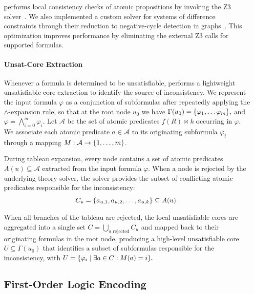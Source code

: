 \documentclass{easychair}
\begin{document}
\stlsat{} performs local consistency checks of atomic propositions by invoking the Z3 solver~\cite{Z3}.
We also implemented a custom solver for systems of difference constraints through their reduction to negative-cycle detection in graphs~\cite{cormen2022introduction,armando2004sat,DutertreM06}.
This optimization improves performance by eliminating the external Z3 calls for supported formulas.


\paragraph{\textbf{Unsat-Core Extraction}}

Whenever a formula is determined to be unsatisfiable, \stlsat{} performs a lightweight unsatisfiable-core extraction to identify the source of inconsistency. 
%
We represent the input formula $\varphi$ as a conjunction of subformulas after repeatedly applying the $\land$-expansion rule, so that at the root node $u_0$ we have
%
\(
    \Gamma(u_0) = \{ \varphi_1, \dots \varphi_m \},
\)
and
$\varphi = \bigwedge_{i=0}^m \varphi_i$.
%
Let $\mathcal{A}$ be the set of atomic predicates $f(R)\bowtie k$ occurring in $\varphi$.
We associate each atomic predicate $a \in \mathcal{A}$ to its originating subformula $\varphi_i$ through a mapping $M: \mathcal{A} \to \{ 1, \dots, m \}$.

During tableau expansion, every node contains a set of atomic predicates $A(u) \subseteq \mathcal{A}$ extracted from the input formula $\varphi$. When a node is rejected by the underlying theory solver, the solver provides the subset of conflicting atomic predicates responsible for the inconsistency:
%
\begin{equation*}
    C_u = \{ a_{u,1}, a_{u,2}, \dots, a_{u,k} \} \subseteq A(u).
\end{equation*}

When all branches of the tableau are rejected, the local unsatisfiable cores are aggregated into a single set $C = \bigcup_{u\text{ rejected}} C_u$ and mapped back to their originating formulas in the root node, producing a high-level unsatisfiable core $U \subseteq \Gamma(u_0)$ that identifies a subset of subformulas responsible for the inconsistency, with
%
\(
    U = \{ \varphi_i \mid \exists a \in C : M(a) = i \}.
\)


\subsection{First-Order Logic Encoding}
\label{sec:fol-encoding}
\end{document}
